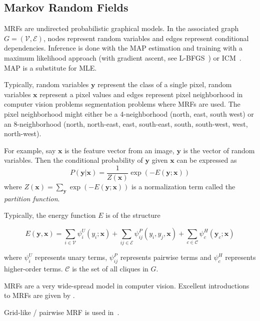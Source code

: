
\subsection{Markov Random Fields}\label{subsec:markov-random-fields}
\Glspl{MRF} are undirected probabilistic graphical models. In the associated
graph $G=(\mathcal{V}, \mathcal{E})$, nodes represent random variables and
edges represent conditional dependencies. Inference is done with the \gls{MAP}
estimation and training with a maximum likelihood approach (with gradient
ascent, see L-BFGS~\cite{liu1989limited}) or \gls{ICM}~\cite{10.2307/2345426}.
\Gls{MAP} is a substitute for \gls{MLE}.

Typically, random variables $\mathbf{y}$ represent the class of a single pixel,
random variables $\mathbf{x}$ represent a pixel values
and edges represent pixel neighborhood in computer vision problems segmentation problems
where \glspl{MRF} are used. The pixel neighborhood might either be a
4-neighborhood (north, east, south west) or an 8-neighborhood (north,
north-east, east, south-east, south, south-west, west, north-west).

For example, say $\mathbf{x}$ is the feature vector from an image, $\mathbf{y}$
is the vector of random variables. Then the conditional probability of $\mathbf{y}$
given $\mathbf{x}$ can be expressed as
\[P(\mathbf{y}|\mathbf{x}) = \frac{1}{Z(\mathbf{x})} \exp(-E(\mathbf{y};\mathbf{x}))\]
where $Z(\mathbf{x}) = \sum_{\mathbf{y}} \exp(-E(\mathbf{y};\mathbf{x}))$ is
a normalization term called the \textit{partition function}.

Typically, the energy function $E$ is of the structure

\[E(\mathbf{y}, \mathbf{x}) = \sum_{i \in \mathcal{V}} \psi_i^U (y_i; \mathbf{x}) + \sum_{ij \in \mathcal{E}} \psi_{ij}^P(y_i, y_j, \mathbf{x}) + \sum_{c \in \mathcal{C}} \psi_c^H(\mathbf{y}_c; \mathbf{x})\]

where $\psi_i^U$ represents unary terms, $\psi_{ij}^P$ represents pairwise
terms and $\psi_c^H$ represents higher-order terms. $\mathcal{C}$ is the set
of all cliques in $G$.


\Glspl{MRF} are a very wide-spread model in computer vision. Excellent
introductions to \glspl{MRF} are given by
\cite{blake2011markov,murphy2012machine}.


Grid-like / pairwise \gls{MRF} is used in~\cite{rother2004grabcut}.

